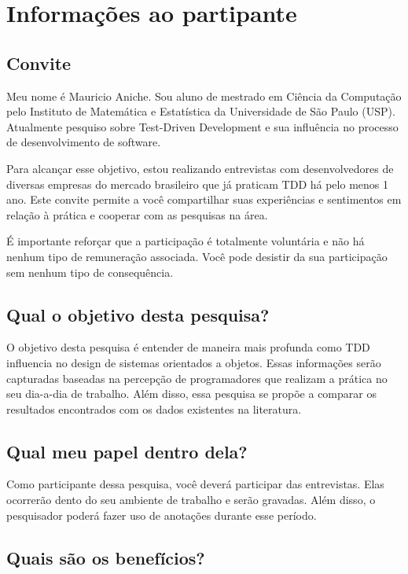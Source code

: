 \chapter{Informações ao partipante}
\label{ape:informacoes-participante}

\section{Convite}

Meu nome é Mauricio Aniche. Sou aluno de mestrado em Ciência da Computação pelo
Instituto de Matemática e Estatística da Universidade de São Paulo (USP).
Atualmente pesquiso sobre Test-Driven Development e sua influência no processo
de desenvolvimento de software.

Para alcançar esse objetivo, estou realizando entrevistas com desenvolvedores de
diversas empresas do mercado brasileiro que já praticam TDD há pelo menos 1 ano.
Este convite permite a você compartilhar suas experiências e sentimentos em
relação à prática e cooperar com as pesquisas na área.

É importante reforçar que a participação é totalmente voluntária e não há nenhum
tipo de remuneração associada. Você pode desistir da sua participação sem nenhum
tipo de consequência.

\section{Qual o objetivo desta pesquisa?}

O objetivo desta pesquisa é entender de maneira mais profunda como TDD
influencia no design de sistemas orientados a objetos. Essas informações serão
capturadas baseadas na percepção de programadores que realizam a prática no seu
dia-a-dia de trabalho. Além disso, essa pesquisa se propõe a comparar os
resultados encontrados com os dados existentes na literatura.

\section{Qual meu papel dentro dela?}

Como participante dessa pesquisa, você deverá participar das entrevistas. Elas
ocorrerão dento do seu ambiente de trabalho e serão gravadas. Além disso, o
pesquisador poderá fazer uso de anotações durante esse período.

\section{Quais são os benefícios?}

